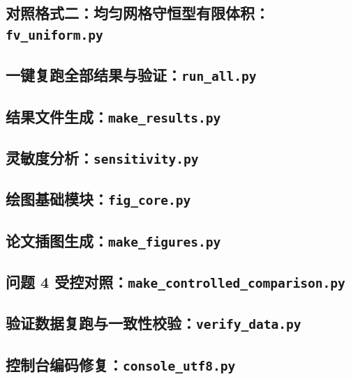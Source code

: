 \documentclass[withoutpreface,bwprint]{cumcmthesis}
\begin{document}
\subsection{对照格式二：均匀网格守恒型有限体积：\texttt{fv\_uniform.py}}


\subsection{一键复跑全部结果与验证：\texttt{run\_all.py}}


\subsection{结果文件生成：\texttt{make\_results.py}}


\subsection{灵敏度分析：\texttt{sensitivity.py}}


\subsection{绘图基础模块：\texttt{fig\_core.py}}


\subsection{论文插图生成：\texttt{make\_figures.py}}


\subsection{问题 4 受控对照：\texttt{make\_controlled\_comparison.py}}


\subsection{验证数据复跑与一致性校验：\texttt{verify\_data.py}}


\subsection{控制台编码修复：\texttt{console\_utf8.py}}

\end{document}
